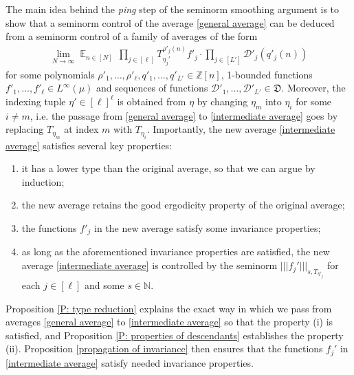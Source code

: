 \documentclass[11pt]{amsart}
\theoremstyle{definition}
\newcommand{\N}{{\mathbb N}}
\newcommand{\Z}{{\mathbb Z}}
\newcommand{\CD}{{\mathcal D}}
\newcommand{\FD}{{\mathfrak D}}
\newcommand{\nnorm}[1]{\lvert\!|\!| #1|\!|\!\rvert}
\DeclareMathOperator*{\E}{\mathbb{E}}
\begin{document}
The main idea behind the \textit{ping} step of the seminorm smoothing argument is to show that a seminorm control of the average \eqref{general average} can be deduced from a seminorm control of a family of averages of the form
\begin{align}\label{intermediate average}
    \lim_{N\to\infty}\E_{n\in [N]} \,\prod_{j\in[\ell]}T_{{\eta_j'}}^{\rho'_j(n)}f'_j \cdot \prod_{j\in[L']}\CD'_{j}(q'_j(n))
\end{align}
for some polynomials $\rho'_1, \ldots, \rho'_\ell, q'_1, \ldots, q'_{L'}\in\Z[n]$, 1-bounded functions $f'_1, \ldots, f'_\ell\in L^\infty(\mu)$  and sequences of functions $\CD'_1, \ldots, \CD'_{L'}\in\FD$. Moreover, the indexing tuple $\eta'\in[\ell]^\ell$ is obtained from $\eta$ by changing $\eta_m$ into $\eta_i$ for some $i\neq m$, i.e. the passage from \eqref{general average} to \eqref{intermediate average} goes by replacing $T_{\eta_m}$ at index $m$ with $T_{\eta_i}$. Importantly, the new average \eqref{intermediate average} satisfies several key properties:
\begin{enumerate}
    \item it has a lower type than the original average, so that we can argue by induction;
    \item the new average retains the good ergodicity property of the original average;
    \item the functions $f'_j$ in the new average satisfy some invariance properties;
    \item  as long as the aforementioned invariance properties are satisfied, the new average \eqref{intermediate average} is controlled by the seminorm $\nnorm{f_j'}_{s, T_{\eta'_j}}$  for each $j\in[\ell]$ and some $s\in\N$.
\end{enumerate}
Proposition \ref{P: type reduction} explains the exact way in which we pass from averages \eqref{general average} to \eqref{intermediate average} so that the property (i) is satisfied, and Proposition \ref{P: properties of descendants} establishes  the property (ii). Proposition \ref{propagation of invariance} then ensures that the functions $f_j'$ in \eqref{intermediate average} satisfy needed invariance properties.
\end{document}
